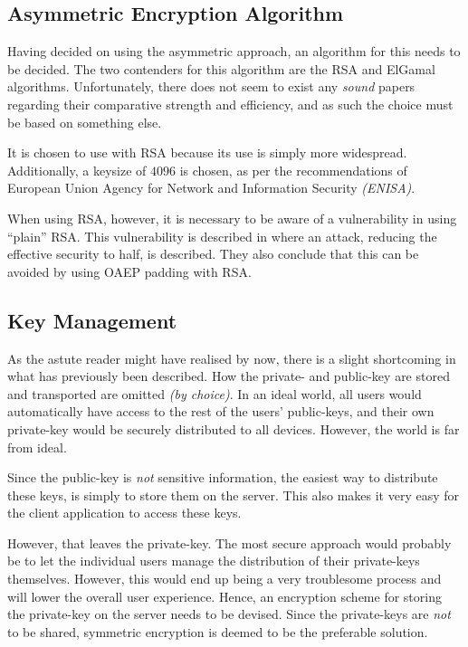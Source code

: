 		\subsection{Asymmetric Encryption Algorithm}
			\label{sec:encryption_choice:rsa_size}
			Having decided on using the asymmetric approach, an algorithm for this needs to be decided. The two contenders for this algorithm are the RSA and ElGamal algorithms. Unfortunately, there does not seem to exist any \emph{sound} papers regarding their comparative strength and efficiency, and as such the choice must be based on something else.

			It is chosen to use with RSA because its use is simply more widespread. Additionally, a keysize of $4096$ is chosen, as per the recommendations of European Union Agency for Network and Information Security \emph{(ENISA)}\cite[p.37]{enisa}.

			When using RSA, however, it is necessary to be aware of a vulnerability in using ``plain'' RSA. This vulnerability is described in \cite{boneh2000textbook} where an attack, reducing the effective security to half, is described. They also conclude that this can be avoided by using OAEP padding with RSA.

		\subsection{Key Management}
			\label{sec:keys}
			As the astute reader might have realised by now, there is a slight shortcoming in what has previously been described. How the private- and public-key are stored and transported are omitted \emph{(by choice)}. In an ideal world, all users would automatically have access to the rest of the users' public-keys, and their own private-key would be securely distributed to all devices. However, the world is far from ideal.

			Since the public-key is \emph{not} sensitive information, the easiest way to distribute these keys, is simply to store them on the server. This also makes it very easy for the client application to access these keys.

			However, that leaves the private-key. The most secure approach would probably be to let the individual users manage the distribution of their private-keys themselves. However, this would end up being a very troublesome process and will lower the overall user experience. Hence, an encryption scheme for storing the private-key on the server needs to be devised. Since the private-keys are \emph{not} to be shared, symmetric encryption is deemed to be the preferable solution.

